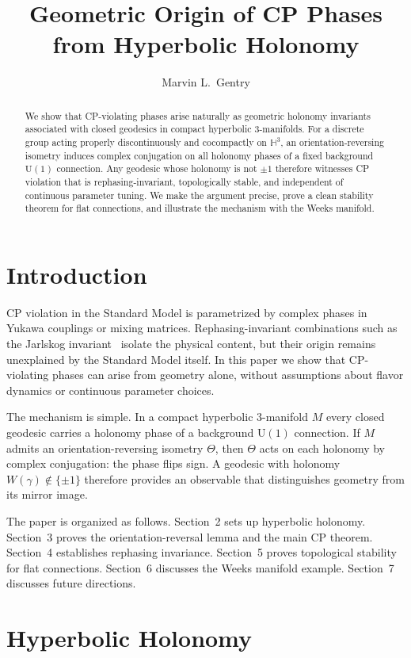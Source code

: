 ﻿\documentclass[12pt]{article}
\title{Geometric Origin of CP Phases from Hyperbolic Holonomy}
\author{Marvin L.\ Gentry}
\date{}
\theoremstyle{definition}
\theoremstyle{remark}
\newcommand{\Uone}{\mathrm{U}(1)}
\begin{document}
\maketitle

\begin{abstract}
We show that CP-violating phases arise naturally as geometric holonomy
invariants associated with closed geodesics in compact hyperbolic
3-manifolds. For a discrete group acting properly discontinuously and
cocompactly on $\mathbb{H}^3$, an orientation-reversing isometry induces
complex conjugation on all holonomy phases of a fixed background
$\mathrm{U}(1)$ connection. Any geodesic whose holonomy is not $\pm 1$
therefore witnesses CP violation that is rephasing-invariant, topologically
stable, and independent of continuous parameter tuning. We make the
argument precise, prove a clean stability theorem for flat connections,
and illustrate the mechanism with the Weeks manifold.
\end{abstract}

\section{Introduction}

CP violation in the Standard Model is parametrized by complex phases in
Yukawa couplings or mixing matrices. Rephasing-invariant combinations such
as the Jarlskog invariant~\cite{Jarlskog} isolate the physical content, but
their origin remains unexplained by the Standard Model itself. In this paper
we show that CP-violating phases can arise from geometry alone, without
assumptions about flavor dynamics or continuous parameter choices.

The mechanism is simple. In a compact hyperbolic 3-manifold $M$ every
closed geodesic carries a holonomy phase of a background $\Uone$
connection. If $M$ admits an orientation-reversing isometry $\Theta$, then
$\Theta$ acts on each holonomy by complex conjugation: the phase flips sign.
A geodesic with holonomy $W(\gamma)\notin\{\pm1\}$ therefore provides an
observable that distinguishes geometry from its mirror image.

The paper is organized as follows. Section~2 sets up hyperbolic holonomy.
Section~3 proves the orientation-reversal lemma and the main CP theorem.
Section~4 establishes rephasing invariance. Section~5 proves topological
stability for flat connections. Section~6 discusses the Weeks manifold
example. Section~7 discusses future directions.

\section{Hyperbolic Holonomy}
\end{document}
